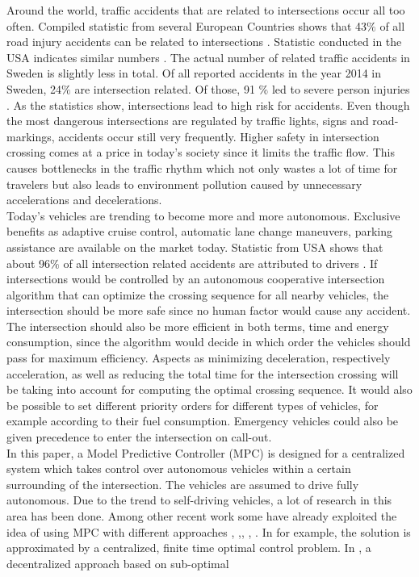 \documentclass[letterpaper,10pt,conference]{ieeeconf}
\begin{document}
Around the world, traffic accidents that are related to intersections occur all too often. Compiled statistic from several European Countries shows that 43$\%$ of all road injury accidents can be related to intersections \cite{molinero}. Statistic conducted in the USA indicates similar numbers \cite{nhtsa}. The actual number of related traffic accidents in Sweden is slightly less in total. Of all reported accidents in the year 2014 in Sweden, 24$\%$ are intersection related. Of those, 91 $\%$ led to severe person injuries \cite{sverige}. As the statistics show, intersections lead to high risk for accidents. Even though the most dangerous intersections are regulated by traffic lights, signs and road-markings, accidents occur still very frequently. Higher safety in intersection crossing comes at a price in today's society since it limits the traffic flow. This causes bottlenecks in the traffic rhythm which not only wastes a lot of time for travelers but also leads to environment pollution caused by unnecessary accelerations and decelerations.\\ \indent
Today's vehicles are trending to become more and more autonomous. Exclusive benefits as adaptive cruise control, automatic lane change maneuvers, parking assistance are available on the market today. Statistic from USA shows that about 96$\%$ of all intersection related accidents are attributed to drivers \cite{nhtsa}. If intersections would be controlled by an autonomous cooperative intersection algorithm that can optimize the crossing sequence for all nearby vehicles, the intersection should be more safe since no human factor would cause any accident. The intersection should also be more efficient in both terms, time and energy consumption, since the algorithm would decide in which order the vehicles should pass for maximum efficiency. Aspects as minimizing deceleration, respectively acceleration, as well as reducing the total time for the intersection crossing will be taking into account for computing the optimal crossing sequence. It would also be possible to set different priority orders for different types of vehicles, for example according to their fuel consumption. Emergency vehicles could also be given precedence to enter the intersection on call-out.\\ \indent
In this paper, a Model Predictive Controller (MPC) is designed for a centralized system which takes control over autonomous vehicles within a certain surrounding of the intersection. The vehicles are assumed to drive fully autonomous. Due to the trend to self-driving vehicles, a lot of research in this area has been done. Among other recent work some have already exploited the idea of using MPC with different approaches \cite{eleven}, \cite{twelve},\cite{thirteen}, \cite{fourteen}, \cite{fifteen}. In \cite{thirteen} for example, the solution is approximated by a centralized, finite time optimal control problem. In \cite{fourteen}, a decentralized approach based on sub-optimal
\end{document}
